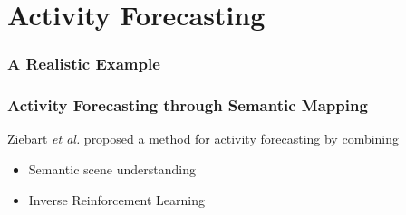 \section{Activity Forecasting}

\begin{frame}
	\frametitle{A Realistic Example}
	
	\begin{center}
	\end{center}
\end{frame}

\begin{frame}
	\frametitle{Activity Forecasting through Semantic Mapping}
	
	\vspace{0.7cm}
	
	\large
	
	Ziebart \emph{et al.} proposed a method for activity forecasting by combining
	
	\begin{itemize}
		\item Semantic scene understanding
		\vspace{0.05cm}
		\item Inverse Reinforcement Learning
	\end{itemize}
	
	\begin{center}
	\end{center}
\end{frame}

